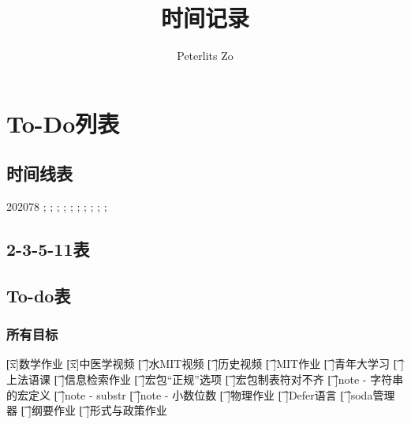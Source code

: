 \documentclass{peterlitsdoc}
\title{时间记录}
\author{Peterlits Zo}
\begin{document}
\maketitle
\tableofcontents
\newpage


\section{To-Do列表}

\subsection{时间线表}

\begin{plttimeline}{2020}{7}{8}
    ;
    ;
    ;
    ;
    ;
    ;
    ;
    ;
    ;
    ;
\end{plttimeline}

\subsection{2-3-5-11表}

% 
% 

\subsection{To-do表}

\subsubsection{所有目标}

\bigskip

\begin{plttodoenv}{4}
\t[x]数学作业      
\t[x]中医学视频
\t[ ]水MIT视频                         
\t[ ]历史视频
\t[ ]MIT作业       
\t[ ]青年大学习                        
\t[ ]上法语课
\t[ ]信息检索作业  
\t[ ]宏包“正规”选项
\t[ ]宏包制表符对不齐
\t[ ]note - 字符串的宏定义
\t[ ]note - substr
\t[ ]note - 小数位数
\t[ ]物理作业
\t[ ]Defer语言
\t[ ]soda管理器
\t[ ]纲要作业
\t[ ]形式与政策作业
\end{plttodoenv}
\end{document}
